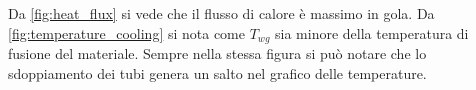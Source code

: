 
Da \autoref{fig:heat_flux} si vede che il flusso di calore è massimo in gola. Da \autoref{fig:temperature_cooling} si nota come $T_{wg}$ sia minore della temperatura di fusione del materiale. Sempre nella stessa figura si può notare che lo sdoppiamento dei tubi genera un salto nel grafico delle temperature.